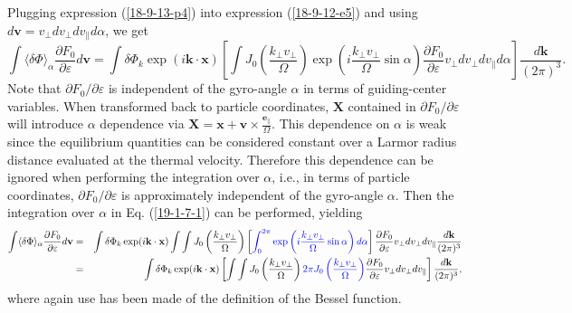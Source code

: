 \documentclass{llncs}
\newcommand{\tmcolor}[2]{{\color{#1}{#2}}}
\begin{document}
Plugging expression (\ref{18-9-13-p4}) into expression (\ref{18-9-12-e5}) and
using $d\mathbf{v}= v_{\perp} d v_{\perp} d v_{\parallel} d \alpha$, we get
\begin{equation}
  \label{19-1-7-1} \int \langle \delta \Phi \rangle_{\alpha} \frac{\partial
  F_0}{\partial \varepsilon} d\mathbf{v}= \int \delta \Phi_k \exp (i\mathbf{k}
  \cdot \mathbf{x}) \left[ \int J_0 \left( \frac{k_{\perp} v_{\perp}}{\Omega}
  \right) \exp \left( i \frac{k_{\perp} v_{\perp}}{\Omega} \sin \alpha \right)
  \frac{\partial F_0}{\partial \varepsilon} v_{\perp} d v_{\perp} d
  v_{\parallel} d \alpha \right] \frac{d\mathbf{k}}{(2 \pi)^3} .
\end{equation}
Note that $\partial F_0 / \partial \varepsilon$ is independent of the
gyro-angle $\alpha$ in terms of guiding-center variables. When transformed
back to particle coordinates, $\mathbf{X}$ contained in $\partial F_0 /
\partial \varepsilon$ will introduce $\alpha$ dependence via
$\mathbf{X}=\mathbf{x}+\mathbf{v} \times
\frac{\mathbf{e}_{\parallel}}{\Omega}$. This dependence on $\alpha$ is weak
since the equilibrium quantities can be considered constant over a Larmor
radius distance evaluated at the thermal velocity. Therefore this dependence
can be ignored when performing the integration over $\alpha$, i.e., in terms
of particle coordinates, $\partial F_0 / \partial \varepsilon$ is
approximately independent of the gyro-angle $\alpha$. Then the integration
over $\alpha$ in Eq. (\ref{19-1-7-1}) can be performed, yielding
\begin{eqnarray}
  \int \langle \delta \Phi \rangle_{\alpha} \frac{\partial F_0}{\partial
  \varepsilon} d\mathbf{v} & = & \int \delta \Phi_k \exp (i\mathbf{k} \cdot
  \mathbf{x}) \int \int J_0 \left( \frac{k_{\perp} v_{\perp}}{\Omega} \right)
  \left[ \tmcolor{blue}{\int_0^{2 \pi} \exp \left( i \frac{k_{\perp}
  v_{\perp}}{\Omega} \sin \alpha \right) d \alpha} \right] \frac{\partial
  F_0}{\partial \varepsilon} v_{\perp} d v_{\perp} d v_{\parallel}
  \frac{d\mathbf{k}}{(2 \pi)^3} \nonumber\\
  & = & \int \delta \Phi_k \exp (i\mathbf{k} \cdot \mathbf{x}) \left[ \int
  \int J_0 \left( \frac{k_{\perp} v_{\perp}}{\Omega} \right) \tmcolor{blue}{2
  \pi J_0 \left( \frac{k_{\perp} v_{\perp}}{\Omega} \right)} \frac{\partial
  F_0}{\partial \varepsilon} v_{\perp} d v_{\perp} d v_{\parallel} \right]
  \frac{d\mathbf{k}}{(2 \pi)^3},  \label{18-9-13-a4}
\end{eqnarray}
where again use has been made of the definition of the Bessel function.
\end{document}
